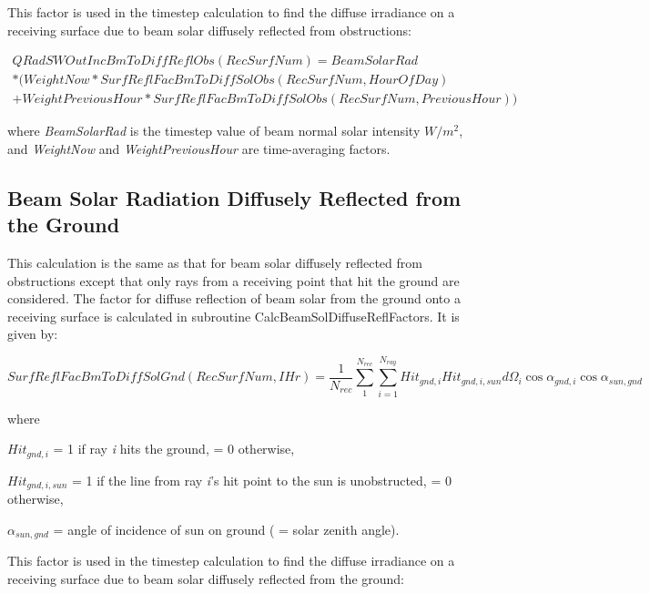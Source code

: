 This factor is used in the timestep calculation to find the diffuse irradiance on a receiving surface due to beam solar diffusely reflected from obstructions:

\begin{equation}
\begin{split}
QRadSWOutIncBmToDiffReflObs(RecSurfNum) = BeamSolarRad \\
* (WeightNow * SurfReflFacBmToDiffSolObs(RecSurfNum,HourOfDay) \\
+ WeightPreviousHour * SurfReflFacBmToDiffSolObs(RecSurfNum,PreviousHour))
\end{split}
\end{equation}

where \emph{BeamSolarRad} is the timestep value of beam normal solar intensity \(W/{m^2}\), and \emph{WeightNow} and \emph{WeightPreviousHour} are time-averaging factors.

\subsection{Beam Solar Radiation Diffusely Reflected from the Ground}\label{beam-solar-radiation-diffusely-reflected-from-the-ground}

This calculation is the same as that for beam solar diffusely reflected from obstructions except that only rays from a receiving point that hit the ground are considered. The factor for diffuse reflection of beam solar from the ground onto a receiving surface is calculated in subroutine CalcBeamSolDiffuseReflFactors. It is given by:

{\scriptsize
\begin{equation}
{SurfReflFacBmToDiffSolGnd(RecSurfNum,IHr)} = \frac{1}{{{N_{rec}}}}\sum\limits_1^{{N_{rec}}} {\sum\limits_{i = 1}^{{N_{ray}}} {Hi{t_{gnd,i}}Hi{t_{gnd,i,sun}}d{\Omega_i}\cos {\alpha_{gnd,i}}\cos {\alpha_{sun,gnd}}} }
\end{equation}}

where

\(Hi{t_{gnd,i}}\) = 1 if ray \emph{i} hits the ground, = 0 otherwise,

\(Hi{t_{gnd,i,sun}}\) = 1 if the line from ray \emph{i}'s hit point to the sun is unobstructed, = 0 otherwise,

\({\alpha_{sun,gnd}}\) = angle of incidence of sun on ground ( = solar zenith angle).

This factor is used in the timestep calculation to find the diffuse irradiance on a receiving surface due to beam solar diffusely reflected from the ground:

